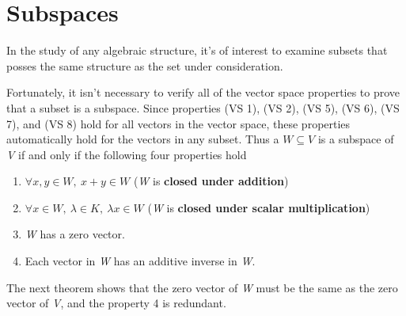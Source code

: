 \section{Subspaces}

In the study of any algebraic structure, it's of interest to examine subsets that posses the same structure as the set under consideration.



\noindent Fortunately, it isn't necessary to verify all of the vector space properties to prove that a subset is a subspace. Since properties (VS 1), (VS 2), (VS 5), (VS 6), (VS 7), and (VS 8) hold for all vectors in the vector space, these properties automatically hold for the vectors in any subset. Thus a $W \subseteq V$ is a subspace of \textit V if and only if the following four properties hold

\begin{enumerate}
  \item $\forall x, y \in W,~ x + y \in W$ (\textit W is \textbf{closed under addition})
  \item $\forall x \in W,~ \lambda \in K, ~ \lambda x  \in W$ (\textit W is \textbf{closed under scalar multiplication})
  \item \textit W has a zero vector.
  \item Each vector in \textit W has an additive inverse in \textit W.
\end{enumerate}

The next theorem shows that the zero vector of \textit W must be the same as the zero vector of \textit V, and the property 4 is redundant.


